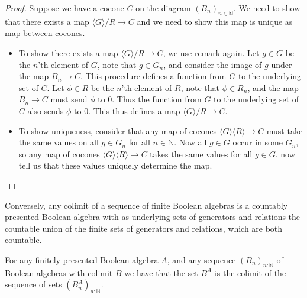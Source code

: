 \begin{proof}
  Suppose we have a cocone $C$ on the diagram $(B_n)_{n\in\mathbb N}$. 
  We need to show that there exists a map $\langle G \rangle / R\to C$ and
  we need to show this map is unique as map between cocones. 
  \begin{itemize}
    \item To show there exists a map $\langle G \rangle / R \to C$, 
      we use remark  again. 
      Let $g\in G$ be the $n$'th element of $G$, 
      note that $g\in G_n$, and consider the image of $g$ under the map $B_n \to C$. 
      This procedure defines a function from $G$ to the underlying set of $C$. 
      Let $\phi \in R$ be the $n$'th element of $R$, 
      note that $\phi \in R_n$, and the map $B_n \to C$ must send $\phi$ to $0$. 
      Thus the function from $G$ to the underlying set of $C$ also sends $\phi$ to $0$. 
      This thus defines a map $\langle G \rangle / R \to C$. 
    \item To show uniqueness, consider that any map of cocones $\langle G \rangle \langle R \rangle \to C$ 
      must take the same values on all $g\in G_n$ for all $n\in\mathbb N$. 
      Now all $g\in G$ occur in some $G_n$, so any map of cocones $\langle G \rangle \langle R \rangle \to C$ 
      takes the same values for all $g\in G$. 
       now tell us that these values uniquely determine the map. 
  \end{itemize}
\end{proof}
\begin{remark}
  Conversely, any colimit of a sequence of finite Boolean algebras 
  is a countably presented Boolean algebra with 
  as underlying sets of generators and relations the countable union of the finite sets of 
  generators and relations, which are both countable. 
\end{remark}
\begin{lemma}\label{lemFinitelyPresentedBACompact}
  For any finitely presented Boolean algebra $A$,
  and any sequence $(B_n)_{n:\mathbb N}$ of Boolean algebras with colimit $B$
  we have that the set $B^A$ is the colimit of the sequence of sets $(B_n^A)_{n:\mathbb N}$. 
\end{lemma}  
